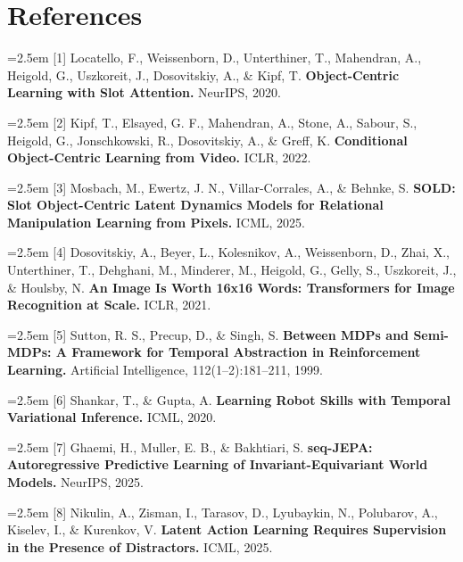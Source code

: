 \documentclass[11pt]{article}
\begin{document}
\section*{References}

\noindent\hangindent=2.5em [1] Locatello, F., Weissenborn, D., Unterthiner, T., Mahendran, A., Heigold, G., Uszkoreit, J., Dosovitskiy, A., \& Kipf, T. \textbf{Object-Centric Learning with Slot Attention.} NeurIPS, 2020.\par

\noindent\hangindent=2.5em [2] Kipf, T., Elsayed, G. F., Mahendran, A., Stone, A., Sabour, S., Heigold, G., Jonschkowski, R., Dosovitskiy, A., \& Greff, K. \textbf{Conditional Object-Centric Learning from Video.} ICLR, 2022.\par

\noindent\hangindent=2.5em [3] Mosbach, M., Ewertz, J. N., Villar-Corrales, A., \& Behnke, S. \textbf{SOLD: Slot Object-Centric Latent Dynamics Models for Relational Manipulation Learning from Pixels.} ICML, 2025.\par

\noindent\hangindent=2.5em [4] Dosovitskiy, A., Beyer, L., Kolesnikov, A., Weissenborn, D., Zhai, X., Unterthiner, T., Dehghani, M., Minderer, M., Heigold, G., Gelly, S., Uszkoreit, J., \& Houlsby, N. \textbf{An Image Is Worth 16x16 Words: Transformers for Image Recognition at Scale.} ICLR, 2021.\par

\noindent\hangindent=2.5em [5] Sutton, R. S., Precup, D., \& Singh, S. \textbf{Between MDPs and Semi-MDPs: A Framework for Temporal Abstraction in Reinforcement Learning.} Artificial Intelligence, 112(1--2):181--211, 1999.\par

\noindent\hangindent=2.5em [6] Shankar, T., \& Gupta, A. \textbf{Learning Robot Skills with Temporal Variational Inference.} ICML, 2020.\par

\noindent\hangindent=2.5em [7] Ghaemi, H., Muller, E. B., \& Bakhtiari, S. \textbf{seq-JEPA: Autoregressive Predictive Learning of Invariant-Equivariant World Models.} NeurIPS, 2025.\par

\noindent\hangindent=2.5em [8] Nikulin, A., Zisman, I., Tarasov, D., Lyubaykin, N., Polubarov, A., Kiselev, I., \& Kurenkov, V. \textbf{Latent Action Learning Requires Supervision in the Presence of Distractors.} ICML, 2025.\par
\end{document}
